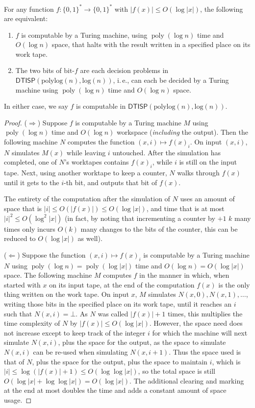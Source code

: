 \documentclass{theoretics}
\DeclareMathOperator{\poly}{poly}
\newcommand*{\ComplexityClass}[1]{\ensuremath{\mathsf{#1}}\xspace}
\newcommand{\DTISP}{\ComplexityClass{DTISP}}
\newcommand{\DTISPpll}{\ensuremath{\DTISP(\mathrm{polylog}(n),\mathrm{log}(n))}\xspace}
\begin{document}
\begin{deflem} \label{def:DTISP}
For any function $f \colon \{0,1\}^* \to \{0,1\}^*$ with $|f(x)| \leq O(\log |x|)$, the following are equivalent:
\begin{enumerate}
\item $f$ is computable by a Turing machine, using $\poly(\log n)$ time and $O(\log n)$ space, that halts with the result written in a specified place on its work tape.

\item The two bits of $\text{bit-}f$ are each decision problems in $\DTISPpll$, i.\,e., can each be decided by a Turing machine using $\poly(\log n)$ time and $O(\log n)$ space. 
\end{enumerate}
In either case, we say $f$ is computable in $\DTISPpll$.
\end{deflem}

\begin{proof}
($\Rightarrow$) Suppose $f$ is computable by a Turing machine $M$ using $\poly(\log n)$ time and $O(\log n)$ workspace (\emph{including} the output). Then the following machine $N$ computes the function $(x,i) \mapsto f(x)_i$. On input $(x,i)$, $N$ simulates $M(x)$ while leaving $i$ untouched. After the simulation has completed, one of $N$'s worktapes contains $f(x)_i$, while $i$ is still on the input tape. Next, using another worktape to keep a counter, $N$ walks through $f(x)$ until it gets to the $i$-th bit, and outputs that bit of $f(x)$. 

The entirety of the computation after the simulation of $N$ uses an amount of space that is $|i| \leq O(|f(x)|) \leq O(\log |x|)$, and time that is at most $|i|^2 \leq O(\log^2 |x|)$ (in fact, by noting that incrementing a counter by $+1$ $k$ many times only incurs $O(k)$ many changes to the bits of the counter, this can be reduced to $O(\log |x|)$ as well).

($\Leftarrow$) Suppose the function $(x,i) \mapsto f(x)_i$ is computable by a Turing machine $N$ using $\poly(\log n) = \poly(\log |x|)$ time and $O(\log n) = O(\log |x|)$ space. The following machine $M$ computes $f$ in the manner in which, when started with $x$ on its input tape, at the end of the computation $f(x)$ is the only thing written on the work tape. On input $x$, $M$ simulates $N(x,0), N(x,1), \dotsc$, writing those bits in the specified place on its work tape, until it reaches an $i$ such that $N(x,i) = \bot$. As $N$ was called $|f(x)|+1$ times, this multiplies the time complexity of $N$ by $|f(x)| \leq O(\log |x|)$. However, the space need does not increase except to keep track of the integer $i$ for which the machine will next simulate $N(x,i)$, plus the space for the output, as the space to simulate $N(x,i)$ can be re-used when simulating $N(x,i+1)$. Thus the space used is that of $N$, plus the space for the output, plus the space to maintain $i$, which is $|i| \leq \log (|f(x)|+1) \leq O(\log \log |x|)$, so the total space is still $O(\log |x| + \log \log|x|) = O(\log |x|)$. The additional clearing and marking at the end at most doubles the time and adds a constant amount of space usage.
\end{proof}
\end{document}
